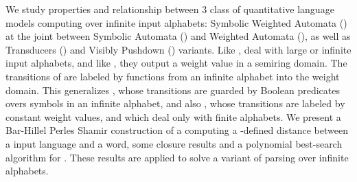 %
%
We study properties and relationship between 3 class of
quantitative language models computing over infinite input alphabets:
Symbolic Weighted Automata (\SWA)
at the joint between Symbolic Automata (\SA) and Weighted Automata (\WA),
as well as Transducers (\SWT) and Visibly Pushdown (\SWVPA) variants.
%
Like \SA, \SWA deal with large or infinite input alphabets,
and like \WA, they output a weight value in a semiring domain.
The transitions of \SWA are labeled by functions from an infinite alphabet into the weight domain.
This generalizes \SA, whose transitions are guarded by Boolean predicates
overs symbols in an infinite alphabet,
and also \WA, whose transitions are labeled by constant weight values,
and which deal only with finite alphabets.
%
We present a Bar-Hillel Perles Shamir construction of a \SWA
computing a \SWT-defined distance between a \SWA input language and a word, 
some closure results 
and a polynomial best-search algorithm for \SWVPA. 
These results are applied to solve a variant of parsing over infinite alphabets.
%

